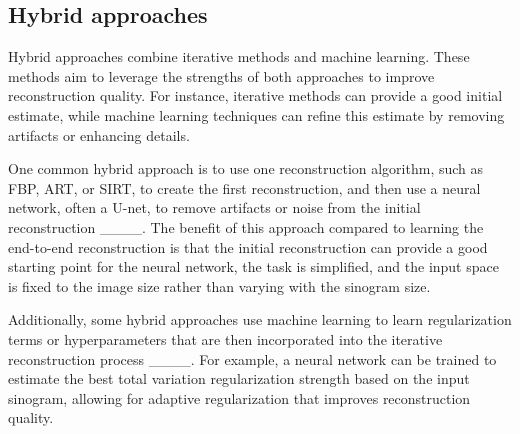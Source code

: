 \subsection{Hybrid approaches}
Hybrid approaches combine iterative methods and machine learning. These methods aim to leverage the strengths of both approaches to improve reconstruction quality. For instance, iterative methods can provide a good initial estimate, while machine learning techniques can refine this estimate by removing artifacts or enhancing details.

One common hybrid approach is to use one reconstruction algorithm, such as FBP, ART, or SIRT, to create the first reconstruction, and then use a neural network, often a U-net, to remove artifacts or noise from the initial reconstruction ____. The benefit of this approach compared to learning the end-to-end reconstruction is that the initial reconstruction can provide a good starting point for the neural network, the task is simplified, and the input space is fixed to the image size rather than varying with the sinogram size.

Additionally, some hybrid approaches use machine learning to learn regularization terms or hyperparameters that are then incorporated into the iterative reconstruction process ____. For example, a neural network can be trained to estimate the best total variation regularization strength based on the input sinogram, allowing for adaptive regularization that improves reconstruction quality.